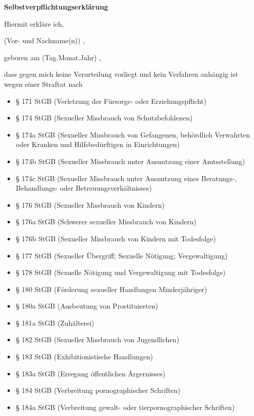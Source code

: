 \documentclass[11pt]{article}
\newcommand{\hint}[1]{{\footnotesize\color{gray}#1}}
\begin{document}
    \textbf{\Large Selbstverpflichtungserklärung}
    \medskip

    Hiermit erkläre ich,

    \hint{(Vor- und Nachname(n))}
    \hrulefill
    ,

    geboren am \hint{(Tag.Monat.Jahr)}
    \hrulefill
    ,

    dass gegen mich keine Verurteilung vorliegt und kein Verfahren anhängig ist wegen einer Straftat nach

    \begin{itemize}[itemsep=-0.1cm]
        \small
        \item § 171 StGB (Verletzung der Fürsorge- oder Erziehungspflicht)
        \item § 174 StGB (Sexueller Missbrauch von Schutzbefohlenen)
        \item § 174a StGB (Sexueller Missbrauch von Gefangenen, behördlich Verwahrten oder Kranken und Hilfsbedürftigen in Einrichtungen)
        \item § 174b StGB (Sexueller Missbrauch unter Ausnutzung einer Amtsstellung)
        \item § 174c StGB (Sexueller Missbrauch unter Ausnutzung eines Beratungs-, Behandlungs- oder Betreuungsverhältnisses)
        \item § 176 StGB (Sexueller Missbrauch von Kindern)
        \item § 176a StGB (Schwerer sexueller Missbrauch von Kindern)
        \item § 176b StGB (Sexueller Missbrauch von Kindern mit Todesfolge)
        \item § 177 StGB (Sexueller Übergriff; Sexuelle Nötigung; Vergewaltigung)
        \item § 178 StGB (Sexuelle Nötigung und Vergewaltigung mit Todesfolge)
        \item § 180 StGB (Förderung sexueller Handlungen Minderjähriger)
        \item § 180a StGB (Ausbeutung von Prostituierten)
        \item § 181a StGB (Zuhälterei)
        \item § 182 StGB (Sexueller Missbrauch von Jugendlichen)
        \item § 183 StGB (Exhibitionistische Handlungen)
        \item § 183a StGB (Erregung öffentlichen Ärgernisses)
        \item § 184 StGB (Verbreitung pornographischer Schriften)
        \item § 184a StGB (Verbreitung gewalt- oder tierpornographischer Schriften)

\end{itemize}
\end{document}
